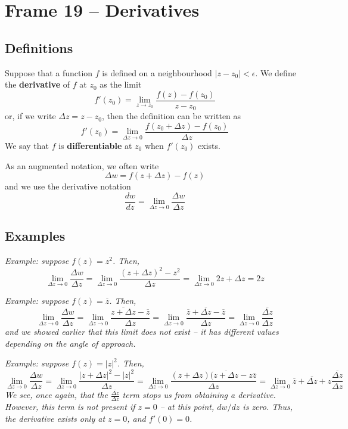 \documentclass{article}
\renewcommand{\emph}{\textbf}
\renewcommand{\bar}{\overline}
\begin{document}
\clearpage
\section{Frame 19 -- Derivatives}
\subsection{Definitions}
Suppose that a function $f$ is defined on a neighbourhood $|z - z_0| < \epsilon$. We define the \emph{derivative} of $f$ at $z_0$ as the limit
\[
	f'(z_0) = \lim_{z \to z_0} \frac{f(z) - f(z_0)}{z - z_0}
\]
or, if we write $\Delta z = z - z_0$, then the definition can be written as
\[
	f'(z_0) = \lim_{\Delta z \to 0} \frac{f(z_0 + \Delta z) - f(z_0)}{\Delta z}
\]
We say that $f$ is \emph{differentiable} at $z_0$ when $f'(z_0)$ exists.

As an augmented notation, we often write
\[
	\Delta w = f(z + \Delta z) - f(z)
\]
and we use the derivative notation
\[
	\frac{dw}{dz} = \lim_{\Delta z \to 0} \frac{\Delta w}{\Delta z}
\]

\subsection{Examples}
\textit{Example: suppose $f(z) = z^2$. Then,
\[
	\lim_{\Delta z \to 0} \frac{\Delta w}{\Delta z}
	= \lim_{\Delta z \to 0} \frac{(z + \Delta z)^2 - z^2}{\Delta z}
	= \lim_{\Delta z \to 0} 2z + \Delta z = 2z
\]}

\textit{Example: suppose $f(z) = \bar{z}$. Then,
\[
	\lim_{\Delta z \to 0} \frac{\Delta w}{\Delta z} 
	= \lim_{\Delta z \to 0} \frac{\overline{z + \Delta z} - \bar{z}}{\Delta z}
	= \lim_{\Delta z \to 0} \frac{\bar{z} + \bar{\Delta z} - \bar{z}}{\Delta z}
	= \lim_{\Delta z \to 0} \frac{\bar{\Delta z}}{\Delta z}
\]
and we showed earlier that this limit does not exist -- it has different values depending on the angle of approach.}

\textit{Example: suppose $f(z) = |z|^2$. Then,
\[
	\lim_{\Delta z \to 0} \frac{\Delta w}{\Delta z}
	= \lim_{\Delta z \to 0} \frac{|z + \Delta z|^2 - |z|^2}{\Delta z}
	= \lim_{\Delta z \to 0} \frac{(z + \Delta z)(\bar{z + \Delta z} - z\bar{z}}{\Delta z}
	= \lim_{\Delta z \to 0} \bar{z} + \bar{\Delta z} + z\frac{\bar{\Delta z}}{\Delta z}
\]
We see, once again, that the $\frac{\bar{\Delta z}}{\Delta z}$ term stops us from obtaining a derivative. However, this term is not present if $z = 0$ -- at this point, $dw/dz$ is zero. Thus, the derivative exists only at $z = 0$, and $f'(0) = 0$.}
\end{document}
